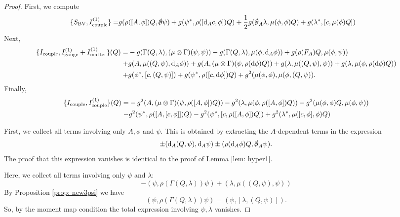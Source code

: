 \documentclass[10pt, oneside]{article}
\begin{document}
\begin{proof}
First, we compute
\begin{align*}
\{S_{\rm BV} , I^{(1)}_{\rm couple}\} = & g (\rho([A, \phi]) Q, \sd \dd \psi) + g (\psi^*, \rho([\d_A c, \phi]) Q) + \frac{1}{2} g (\sd \dd_A \lambda, \mu(\phi, \phi) Q) + g (\lambda^*, [c, \mu(\phi) Q]) 
\end{align*}
Next,
\begin{align*}
\{I_{\rm couple} , I^{(1)}_{\rm gauge} + I^{(1)}_{\rm matter}\} (Q) = & - g (\Gamma(Q, \lambda), (\mu \otimes \Gamma)(\psi,\psi)) - g (\Gamma(Q, \lambda), \mu(\phi, {\rm d}_A \phi)) + g (\rho(F_A)Q , \mu(\phi, \psi)) \\ + & g (A, \mu((Q, \psi), {\rm d}_A \phi)) + g (A, (\mu \otimes \Gamma)(\psi, \rho({\rm d} \phi) Q)) + g (\lambda, \mu((Q, \psi), \psi)) + g (\lambda, \mu(\phi, \rho({\rm d} \phi)  Q)) \\ + & g (\phi^*, [c, (Q,\psi)])  + g (\psi^*, \rho( [c ,{\rm d} \phi ]) Q) + g^2 (\mu(\phi, \phi) , \mu(\phi, (Q, \psi)) . 
\end{align*}
Finally,
\begin{align*}
\{I_{\rm couple}, I^{(1)}_{\rm couple}\} (Q) = & - g^2 (A, (\mu \otimes \Gamma)(\psi, \rho([A, \phi]) Q)) - g^2 (\lambda, \mu(\phi, \rho([A, \phi]) Q)) - g^2 (\mu(\phi, \phi)Q , \mu(\phi, \psi)) \\
- &g^2 (\psi^*, \rho([A, [c,\phi]]) Q) - g^2 (\psi^*, [c, \rho([A,\phi])Q]) + g^2 (\lambda^*, \mu([c,\phi], \phi) Q)  
\end{align*}

First, we collect all terms involving only $A, \phi$ and $\psi$.
This is obtained by extracting the $A$-dependent terms in the expression
\[
\pm (\d_A(Q, \psi), \d_A \psi) \pm (\rho(\d_A\phi)Q, \sd \dd_A \psi) .
\]
The proof that this expression vanishes is identical to the proof of Lemma \ref{lem: hyper1}. 

Here, we collect all terms involving only $\psi$ and $\lambda$:
\[
- (\psi, \rho(\Gamma(Q, \lambda)) \psi) + (\lambda, \mu((Q,\psi), \psi))
\]
By Proposition \ref{prop: new3psi} we have
\[
(\psi, \rho(\Gamma(Q, \lambda)) \psi) = (\psi, [\lambda, (Q, \psi)] ) .
\]
So, by the moment map condition the total expression involving $\psi, \lambda$ vanishes. 


\end{proof}
\end{document}
